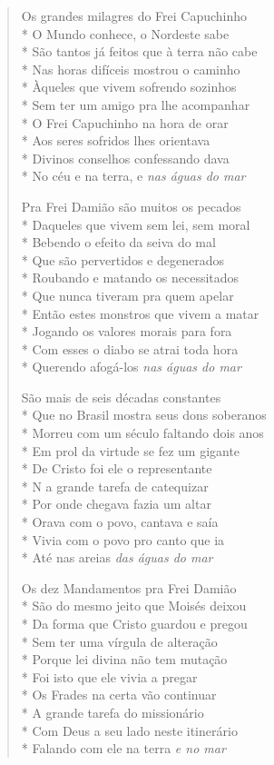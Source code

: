 \begin{verse}
Os grandes milagres do Frei Capuchinho\\*
O Mundo conhece, o Nordeste sabe\\*
São tantos já feitos que à terra não cabe\\*
Nas horas difíceis mostrou o caminho\\*
Àqueles que vivem sofrendo sozinhos\\*
Sem ter um amigo pra lhe acompanhar\\*
O Frei Capuchinho na hora de orar\\*
Aos seres sofridos lhes orientava\\*
Divinos conselhos confessando dava\\*
No céu e na terra, e \textit{nas águas do mar}

Pra Frei Damião são muitos os pecados\\*
Daqueles que vivem sem lei, sem moral\\*
Bebendo o efeito da seiva do mal\\*
Que são pervertidos e degenerados\\*
Roubando e matando os necessitados\\*
Que nunca tiveram pra quem apelar\\*
Então estes monstros que vivem a matar\\*
Jogando os valores morais para fora\\*
Com esses o diabo se atrai toda hora\\*
Querendo afogá-los \textit{nas águas do mar}

São mais de seis décadas constantes\\*
Que no Brasil mostra seus dons soberanos\\*
Morreu com um século faltando dois anos\\*
Em prol da virtude se fez um gigante\\*
De Cristo foi ele o representante\\*
N a grande tarefa de catequizar\\*
Por onde chegava fazia um altar\\*
Orava com o povo, cantava e saía\\*
Vivia com o povo pro canto que ia\\*
Até nas areias \textit{das águas do mar}

Os dez Mandamentos pra Frei Damião\\*
São do mesmo jeito que Moisés deixou\\*
Da forma que Cristo guardou e pregou\\*
Sem ter uma vírgula de alteração\\*
Porque lei divina não tem mutação\\*
Foi isto que ele vivia a pregar\\*
Os Frades na certa vão continuar\\*
A grande tarefa do missionário\\*
Com Deus a seu lado neste itinerário\\*
Falando com ele na terra \textit{e no mar}


\end{verse}
